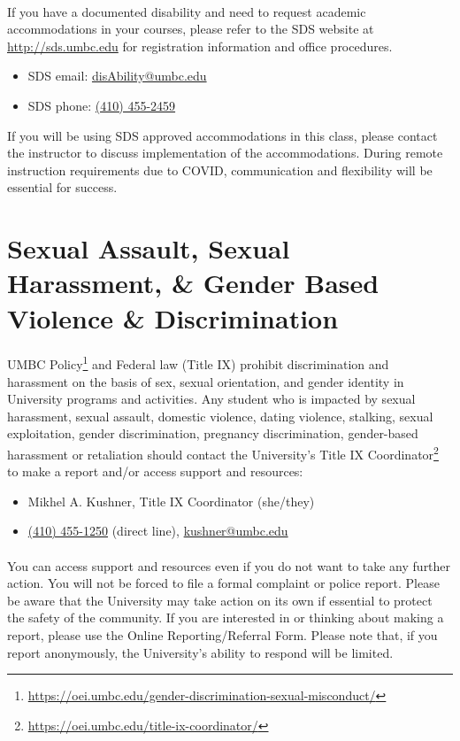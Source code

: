 \documentclass[letter,11pt]{article}
\begin{document}
\paragraph{}If you have a documented disability and need to request academic accommodations in your courses, please refer to the SDS website at \url{http://sds.umbc.edu} for registration information and office procedures.
\begin{itemize}
\item SDS email: \href{mailto:disAbility@umbc.edu}{disAbility@umbc.edu}
\item SDS phone: \href{tel:+14104552459}{(410) 455-2459}
\end{itemize}
If you will be using SDS approved accommodations in this class, please contact the instructor to discuss implementation of the accommodations. During remote instruction requirements due to COVID, communication and flexibility will be essential for success.

\section*{Sexual Assault, Sexual Harassment, \& Gender Based Violence \& Discrimination}
\paragraph{}UMBC Policy\footnote{\url{https://oei.umbc.edu/gender-discrimination-sexual-misconduct/}} and Federal law (Title IX) prohibit discrimination and harassment on the basis of sex, sexual orientation, and gender identity in University programs and activities. Any student who is impacted by sexual harassment, sexual assault, domestic violence, dating violence, stalking, sexual exploitation, gender discrimination, pregnancy discrimination, gender-based harassment or retaliation should contact the University’s Title IX Coordinator\footnote{\url{https://oei.umbc.edu/title-ix-coordinator/}} to make a report and/or access support and resources:
\begin{itemize}
\item Mikhel A. Kushner, Title IX Coordinator (she/they)
\item \href{tel:+14104551250}{(410) 455-1250} (direct line), \href{mailto:kushner@umbc.edu?Subject=Title\%20IX}{kushner@umbc.edu}
\end{itemize}

\paragraph{}You can access support and resources even if you do not want to take any further action. You will not be forced to file a formal complaint or police report. Please be aware that the University may take action on its own if essential to protect the safety of the community. If you are interested in or thinking about making a report, please use the Online Reporting/Referral Form. Please note that, if you report anonymously,  the University’s ability to respond will be limited.
\end{document}
